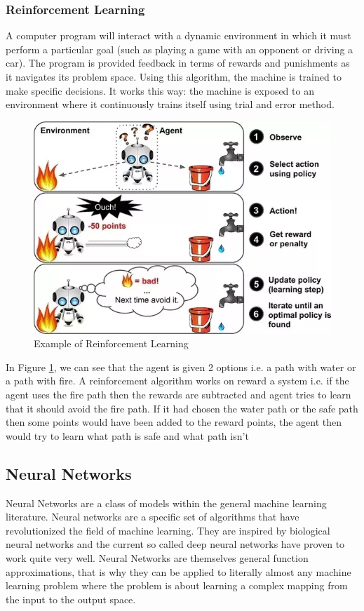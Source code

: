\documentclass{report}
\begin{document}
\subsubsection{Reinforcement Learning}
A computer program will interact with a dynamic environment in which it must perform a particular goal (such as playing a game with an
opponent or driving a car). The program is provided feedback in terms of rewards and punishments as it navigates its problem space. 
Using this algorithm, the machine is trained to make specific decisions. It works this way: the machine is exposed to an environment
where it continuously trains itself using trial and error method.
\begin{figure}[h]
  \centering
  \includegraphics[scale=0.3]{reinforment_learning_example}
  \caption{Example of Reinforcement Learning}
  \label{fig:reinforment_learning_example}
\end{figure}
In Figure \ref{fig:reinforment_learning_example}, we can see that the agent is given 2 options i.e. a path with water or a path with fire. A reinforcement algorithm
works on reward a system i.e. if the agent uses the fire path then the rewards are subtracted and agent tries to learn that it should avoid
the fire path. If it had chosen the water path or the safe path then some points would have been added to the reward points, the agent then
would try to learn what path is safe and what path isn’t

\subsection{Neural Networks}
Neural Networks are a class of models within the general machine learning literature. Neural networks are a specific set of algorithms that
have revolutionized the field of machine learning. They are inspired by biological neural networks and the current so called deep neural
networks have proven to work quite very well. Neural Networks are themselves general function approximations, that is why they can be applied
to literally almost any machine learning problem where the problem is about learning a complex mapping from the input to the output space.
\end{document}
